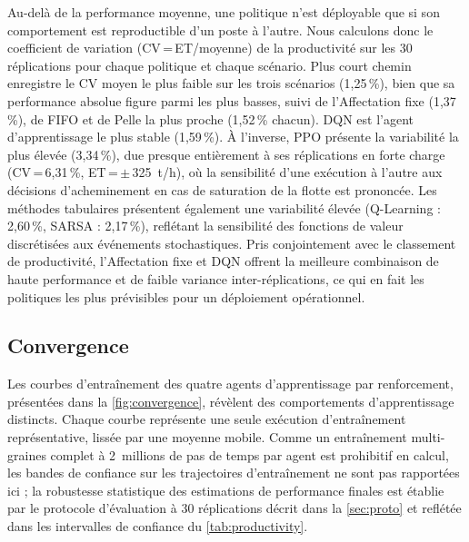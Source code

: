 \documentclass[11pt,a4paper]{article}
\begin{document}
Au-delà de la performance moyenne, une politique n'est déployable que si son comportement est reproductible d'un poste à l'autre. Nous calculons donc le coefficient de variation (CV\,=\,ET/moyenne) de la productivité sur les 30 réplications pour chaque politique et chaque scénario. Plus court chemin enregistre le CV moyen le plus faible sur les trois scénarios (1,25\,\%), bien que sa performance absolue figure parmi les plus basses, suivi de l'Affectation fixe (1,37\,\%), de FIFO et de Pelle la plus proche (1,52\,\% chacun). DQN est l'agent d'apprentissage le plus stable (1,59\,\%). À l'inverse, PPO présente la variabilité la plus élevée (3,34\,\%), due presque entièrement à ses réplications en forte charge (CV\,=\,6,31\,\%, ET\,=\,$\pm$\,325~t/h), où la sensibilité d'une exécution à l'autre aux décisions d'acheminement en cas de saturation de la flotte est prononcée. Les méthodes tabulaires présentent également une variabilité élevée (Q-Learning : 2,60\,\%, SARSA : 2,17\,\%), reflétant la sensibilité des fonctions de valeur discrétisées aux événements stochastiques. Pris conjointement avec le classement de productivité, l'Affectation fixe et DQN offrent la meilleure combinaison de haute performance et de faible variance inter-réplications, ce qui en fait les politiques les plus prévisibles pour un déploiement opérationnel.

\subsection{Convergence}

Les courbes d'entraînement des quatre agents d'apprentissage par renforcement, présentées dans la \cref{fig:convergence}, révèlent des comportements d'apprentissage distincts. Chaque courbe représente une seule exécution d'entraînement représentative, lissée par une moyenne mobile. Comme un entraînement multi-graines complet à 2~millions de pas de temps par agent est prohibitif en calcul, les bandes de confiance sur les trajectoires d'entraînement ne sont pas rapportées ici ; la robustesse statistique des estimations de performance finales est établie par le protocole d'évaluation à 30 réplications décrit dans la \cref{sec:proto} et reflétée dans les intervalles de confiance du \cref{tab:productivity}.
\end{document}
